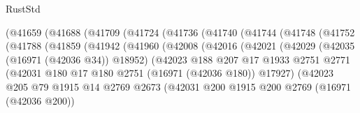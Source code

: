 \begin{lexlean}{RustStd}
\begin{coremodule}
                      (@41659
                        (@41688
                          (@41709
                            (@41724
                              (@41736
                                (@41740
                                  (@41744
                                    (@41748
                                      (@41752
                                        (@41788
                                          (@41859
                                            (@41942
                                              (@41960
                                                (@42008
                                                  (@42016
                                                    (@42021
                                                      (@42029
                                                        (@42035 (@16971 (@42036 @34)) @18952)
                                                        (@42023
                                                          @188
                                                          @207
                                                          @17
                                                          @1933
                                                          @2751
                                                          @2771
                                                          (@42031
                                                            @180
                                                            @17
                                                            @180
                                                            @2751
                                                            (@16971 (@42036 @180))
                                                            @17927)
                                                          (@42023
                                                            @205
                                                            @79
                                                            @1915
                                                            @14
                                                            @2769
                                                            @2673
                                                            (@42031
                                                              @200
                                                              @1915
                                                              @200
                                                              @2769
                                                              (@16971 (@42036 @200))

\end{coremodule}
\end{lexlean}

